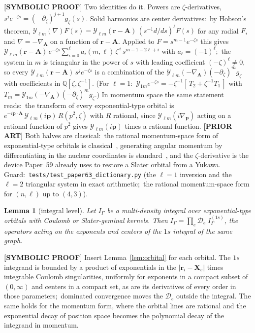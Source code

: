 \documentclass[aps,pra,twocolumn,superscriptaddress,longbibliography]{revtex4-2}
\newtheorem{lemma}{Lemma}
\begin{document}
\textbf{[SYMBOLIC PROOF]} Two identities do it.  Powers are
$\zeta$-derivatives, $s^{j}e^{-\zeta s}=(-\partial_\zeta)^{j+1}g_\zeta(s)$.
Solid harmonics are center derivatives:\ by Hobson's theorem,
$\mathcal{Y}_{\ell m}(\nabla)F(s)=\mathcal{Y}_{\ell m}(\bm r-\bm A)\,(s^{-1}d/ds)^{\ell}F(s)$
for any radial $F$, and $\nabla=-\nabla_{\!\bm A}$ on a function of
$\bm r-\bm A$.  Applied to $F=s^{m-1}e^{-\zeta s}$ this gives
$\mathcal{Y}_{\ell m}(\bm r-\bm A)\,e^{-\zeta s}\sum_{i=0}^{\ell}a_i(m,\ell)\,\zeta^{\,i}\,s^{m-1-2\ell+i}$
with $a_\ell=(-1)^\ell$;\ the system in $m$ is triangular in the power of $s$
with leading coefficient $(-\zeta)^{\ell}\neq0$, so every
$\mathcal{Y}_{\ell m}(\bm r-\bm A)\,s^{j}e^{-\zeta s}$ is a combination of the
$\mathcal{Y}_{\ell m}(-\nabla_{\!\bm A})(-\partial_\zeta)^{m}g_\zeta$ with
coefficients in $\mathbb{Q}[\zeta,\zeta^{-1}]$.  (For $\ell=1$:\
$\mathcal{Y}_{1m}e^{-\zeta s}=-\zeta^{-1}[\,T_2+\zeta^{-1}T_1\,]$ with
$T_m=\mathcal{Y}_{1m}(-\nabla_{\!\bm A})(-\partial_\zeta)^{m}g_\zeta$.)
In momentum space the same statement reads:\ the transform of every
exponential-type orbital is $e^{-i\bm p\cdot\bm A}\,\mathcal{Y}_{\ell m}(i\bm p)\,R(p^2,\zeta)$
with $R$ rational, since $\mathcal{Y}_{\ell m}(i\nabla_{\!\bm p})$ acting on a
rational function of $p^2$ gives $\mathcal{Y}_{\ell m}(i\bm p)$ times a
rational function.  \textbf{[PRIOR ART]} Both halves are classical:\ the
rational momentum-space form of exponential-type orbitals is
classical~\cite{weniger2005}, generating angular momentum by differentiating
in the nuclear coordinates is standard~\cite{weniger2005}, and the
$\zeta$-derivative is the device Paper~59 already uses to restore a Slater
orbital from a Yukawa.  Guard:\ \texttt{tests/test\_paper63\_dictionary.py}
(the $\ell=1$ inversion and the $\ell=2$ triangular system in exact
arithmetic;\ the rational momentum-space form for $(n,\ell)$ up to $(4,3)$).

\begin{lemma}[integral level]
\label{lem:integral}
Let $I_\Gamma$ be a multi-density integral over exponential-type orbitals
with Coulomb or Slater-geminal kernels.  Then
$I_\Gamma=\prod_e\mathcal{D}_e\;I^{(1s)}_\Gamma$, the operators acting on the
exponents and centers of the $1s$ integral of the same graph.
\end{lemma}

\textbf{[SYMBOLIC PROOF]} Insert Lemma~\ref{lem:orbital} for each orbital.
The $1s$ integrand is bounded by a product of exponentials in the
$|\bm r_i-\bm X_v|$ times integrable Coulomb singularities, uniformly for
exponents in a compact subset of $(0,\infty)$ and centers in a compact set, as
are its derivatives of every order in those parameters;\ dominated convergence
moves the $\mathcal{D}_e$ outside the integral.  The same holds for the
momentum form, where the orbital lines are rational and the exponential decay
of position space becomes the polynomial decay of the integrand in momentum.
\end{document}
